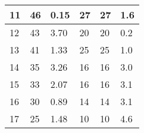 \begin{table}[H]
\begin{tabular}{|l|l|l|l|l|l|}
\hline
11                  & 46                                                             & 0.15                                                             & 27        & 27                                                                          & 1.6                                                                             \\ 
\hline
12                  & 43                                                             & 3.70                                                             & 20        & 20                                                                          & 0.2                                                                             \\ 
\hline
13                  & 41                                                             & 1.33                                                             & 25        & 25                                                                          & 1.0                                                                             \\ 
\hline
14                  & 35                                                             & 3.26                                                             & 16        & 16                                                                          & 3.0                                                                             \\ 
\hline
15                  & 33                                                             & 2.07                                                             & 16        & 16                                                                          & 3.1                                                                             \\ 
\hline
16                  & 30                                                             & 0.89                                                             & 14        & 14                                                                          & 3.1                                                                             \\ 
\hline
17                  & 25                                                             & 1.48                                                             & 10        & 10                                                                          & 4.6                                                                             \\ 

\end{tabular}
\end{table}
